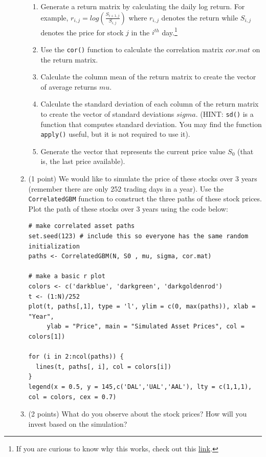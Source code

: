 \documentclass[12point]{article}
\begin{document}
\begin{enumerate}
\begin{enumerate}
\begin{enumerate}
	\item Generate a return matrix by calculating the daily log return. For example, $r_{i,j} = log(\frac{S_{i+1,j}}{S_{i,j}})$ where $r_{i,j}$ denotes the return while $S_{i,j}$ denotes the price for stock $j$ in the $i^{th}$ day.\footnote{If you are curious to know why this works, check out this \href{https://quantivity.wordpress.com/2011/02/21/why-log-returns/}{link}.}
	\item Use the \texttt{cor()} function to calculate the correlation matrix $cor.mat$ on the return matrix.
	\item Calculate the column mean of the return matrix to create the vector of average returns $mu$. 
	\item Calculate the standard deviation of each column of the return matrix to create the vector of standard deviations $sigma$. (HINT: \texttt{sd()} is a function that computes standard deviation. You may find the function \texttt{apply()} useful, but it is not required to use it).
	\item Generate the vector that represents the current price value $S_0$ (that is, the last price available).
\end{enumerate}

\item (1 point) We would like to simulate the price of these stocks over 3 years (remember there are only 252 trading days in a year). Use the \texttt{CorrelatedGBM} function to construct the three paths of these stock prices. Plot the path of these stocks over 3 years using the code below:

\begin{verbatim}
# make correlated asset paths
set.seed(123) # include this so everyone has the same random initialization
paths <- CorrelatedGBM(N, S0 , mu, sigma, cor.mat)

# make a basic r plot 
colors <- c('darkblue', 'darkgreen', 'darkgoldenrod')
t <- (1:N)/252
plot(t, paths[,1], type = 'l', ylim = c(0, max(paths)), xlab = "Year", 
     ylab = "Price", main = "Simulated Asset Prices", col = colors[1])

for (i in 2:ncol(paths)) {
  lines(t, paths[, i], col = colors[i])
}
legend(x = 0.5, y = 145,c('DAL','UAL','AAL'), lty = c(1,1,1), col = colors, cex = 0.7)
\end{verbatim}


\item (2 points) What do you observe about the stock prices? How will you invest based on the simulation?


\end{enumerate}
\end{enumerate}
\end{document}
